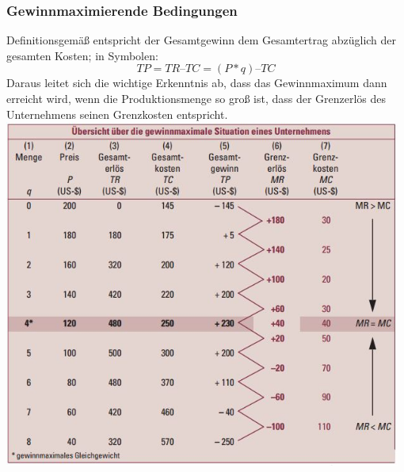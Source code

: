 \documentclass[10pt]{scrartcl}
\begin{document}
\subsubsection{Gewinnmaximierende Bedingungen}
 Definitionsgemäß entspricht der
Gesamtgewinn dem Gesamtertrag abzüglich
der gesamten Kosten; in Symbolen:
\begin{equation}
TP = TR – TC = (P * q) – TC \nonumber
\end{equation}
Daraus leitet sich die wichtige Erkenntnis ab, dass das Gewinnmaximum dann erreicht wird, wenn die Produktionsmenge so groß ist, dass der Grenzerlös des Unternehmens seinen Grenzkosten entspricht.\\
\includegraphics[width=0.98\textwidth]{img/situation.jpg}\\
\end{document}
